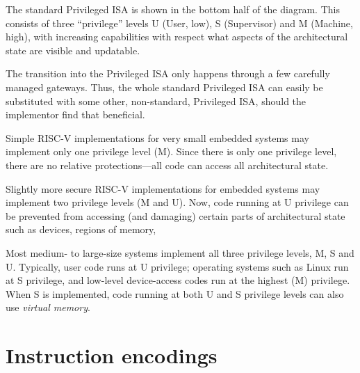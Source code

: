 The standard Privileged ISA is shown in the bottom half of the
diagram.  This consists of three ``privilege'' levels U (User, low), S
(Supervisor) and M (Machine, high), with increasing capabilities with
respect what aspects of the architectural state are visible and
updatable.

The transition into the Privileged ISA only happens through a few
carefully managed gateways.  Thus, the whole standard Privileged ISA
can easily be substituted with some other, non-standard, Privileged
ISA, should the implementor find that beneficial.

Simple RISC-V implementations for very small embedded systems may
implement only one privilege level (M).  Since there is only one
privilege level, there are no relative protections---all code can
access all architectural state.

Slightly more secure RISC-V implementations for embedded systems may
implement two privilege levels (M and U).  Now, code running at U
privilege can be prevented from accessing (and damaging) certain parts
of architectural state such as devices, regions of memory, {\etc}

Most medium- to large-size systems implement all three privilege
levels, M, S and U.  Typically, user code runs at U privilege;
operating systems such as Linux run at S privilege, and low-level
device-access codes run at the highest (M) privilege.  When S is
implemented, code running at both U and S privilege levels can also
use \emph{virtual memory}.


\section{Instruction encodings}

\label{Sec_Instruction_Encodings}

